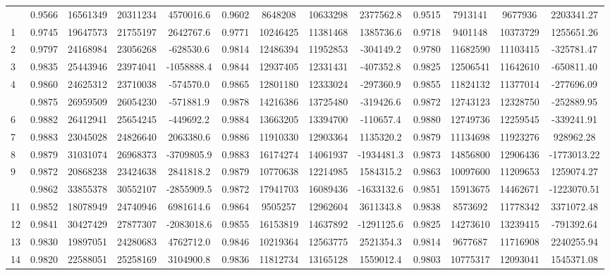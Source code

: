 \documentclass[
  12pt,
]{article}
\begin{document}
\begin{longtable}[t]{lcccccccccccc}
\endfoot
\bottomrule
\endlastfoot
0 & 0.9566 & 16561349 & 20311234 & 4570016.6 & 0.9602 & 8648208 & 10633298 & 2377562.8 & 0.9515 & 7913141 & 9677936 & 2203341.27\\
1 & 0.9745 & 19647573 & 21755197 & 2642767.6 & 0.9771 & 10246425 & 11381468 & 1385736.6 & 0.9718 & 9401148 & 10373729 & 1255651.26\\
2 & 0.9797 & 24168984 & 23056268 & -628530.6 & 0.9814 & 12486394 & 11952853 & -304149.2 & 0.9780 & 11682590 & 11103415 & -325781.47\\
3 & 0.9835 & 25443946 & 23974041 & -1058888.4 & 0.9844 & 12937405 & 12331431 & -407352.8 & 0.9825 & 12506541 & 11642610 & -650811.40\\
4 & 0.9860 & 24625312 & 23710038 & -574570.0 & 0.9865 & 12801180 & 12333024 & -297360.9 & 0.9855 & 11824132 & 11377014 & -277696.09\\
\addlinespace
5 & 0.9875 & 26959509 & 26054230 & -571881.9 & 0.9878 & 14216386 & 13725480 & -319426.6 & 0.9872 & 12743123 & 12328750 & -252889.95\\
6 & 0.9882 & 26412941 & 25654245 & -449692.2 & 0.9884 & 13663205 & 13394700 & -110657.4 & 0.9880 & 12749736 & 12259545 & -339241.91\\
7 & 0.9883 & 23045028 & 24826640 & 2063380.6 & 0.9886 & 11910330 & 12903364 & 1135320.2 & 0.9879 & 11134698 & 11923276 & 928962.28\\
8 & 0.9879 & 31031074 & 26968373 & -3709805.9 & 0.9883 & 16174274 & 14061937 & -1934481.3 & 0.9873 & 14856800 & 12906436 & -1773013.22\\
9 & 0.9872 & 20868238 & 23424638 & 2841818.2 & 0.9879 & 10770638 & 12214985 & 1584315.2 & 0.9863 & 10097600 & 11209653 & 1259074.27\\
\addlinespace
10 & 0.9862 & 33855378 & 30552107 & -2855909.5 & 0.9872 & 17941703 & 16089436 & -1633132.6 & 0.9851 & 15913675 & 14462671 & -1223070.51\\
11 & 0.9852 & 18078949 & 24740946 & 6981614.6 & 0.9864 & 9505257 & 12962604 & 3611343.8 & 0.9838 & 8573692 & 11778342 & 3371072.48\\
12 & 0.9841 & 30427429 & 27877307 & -2083018.6 & 0.9855 & 16153819 & 14637892 & -1291125.6 & 0.9825 & 14273610 & 13239415 & -791392.64\\
13 & 0.9830 & 19897051 & 24280683 & 4762712.0 & 0.9846 & 10219364 & 12563775 & 2521354.3 & 0.9814 & 9677687 & 11716908 & 2240255.94\\
14 & 0.9820 & 22588051 & 25258169 & 3104900.8 & 0.9836 & 11812734 & 13165128 & 1559012.4 & 0.9803 & 10775317 & 12093041 & 1545371.08\\

\end{longtable}
\end{document}
